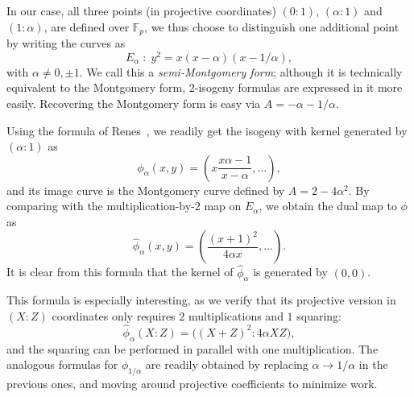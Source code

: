 \documentclass{llncs}
\newcommand{\F}{\mathbb{F}}
\begin{document}
In our case, all three points (in projective coordinates) $(0:1)$,
$(\alpha:1)$ and $(1:\alpha)$, are defined over $\F_p$, we thus choose
to distinguish one additional point by writing the curves as
\[E_\alpha \;:\; y^2 = x(x-\alpha)(x - 1/\alpha),\] %
with $\alpha\ne0,\pm 1$. %
We call this a \emph{semi-Montgomery form}; although it is technically
equivalent to the Montgomery form, $2$-isogeny formulas are expressed
in it more easily. %
Recovering the Montgomery form is easy via $A=-\alpha-1/\alpha$.

Using the formula of Renes~\cite{10.1007/978-3-319-79063-3_11}, we
readily get the isogeny with kernel generated by
$(\alpha:1)$ as
\begin{equation}
  \label{eq:isog-forward}
  \phi_\alpha(x,y) = \left(x\frac{x\alpha - 1}{x - \alpha}, \dots\right),
\end{equation}
and its image curve is the Montgomery curve defined by
$A = 2-4\alpha^2$. %
By comparing with the multiplication-by-$2$ map on $E_\alpha$, we
obtain the dual map to $\phi$ as
\begin{equation}
  \label{eq:isog-backward}
  \hat\phi_\alpha(x,y) = \left(\frac{(x+1)^2}{4\alpha x}, \dots\right).
\end{equation}
It is clear from this formula that the kernel of $\hat\phi_\alpha$ is
generated by $(0,0)$.

This formula is especially interesting, as we verify that its
projective version in $(X:Z)$ coordinates only requires $2$
multiplications and $1$ squaring:
\begin{equation}
  \label{eq:isog-proj}
  \hat\phi_\alpha(X:Z) = \bigl((X+Z)^2 : 4\alpha XZ\bigr),
\end{equation}
and the squaring can be performed in parallel with one
multiplication. %
The analogous formulas for $\phi_{1/\alpha}$ are readily obtained by
replacing $\alpha\to 1/\alpha$ in the previous ones, and moving around
projective coefficients to minimize work.
\end{document}
